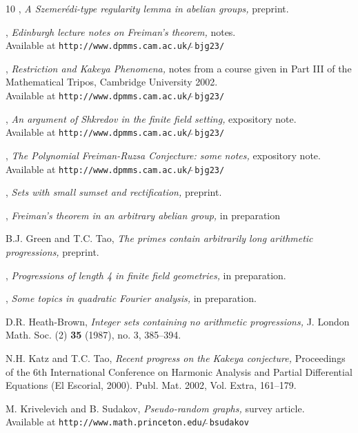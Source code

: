 \documentclass[12pt,a4paper,reqno]{amsart}
\numberwithin{equation}{section}
\theoremstyle{plain}
\theoremstyle{definition}
\begin{document}
\begin{thebibliography}{10}
 \bysame, \emph{A Szemer\'edi-type regularity lemma in abelian groups,} preprint.

 \bysame, \emph{Edinburgh lecture notes on Freiman's theorem,} notes.\\
Available at \texttt{http://www.dpmms.cam.ac.uk/$\widetilde{\;}$bjg23/}

 \bysame, \emph{Restriction and Kakeya Phenomena,} notes from a course given in Part III of the Mathematical Tripos, Cambridge University 2002.\\
Available at \texttt{http://www.dpmms.cam.ac.uk/$\widetilde{\;}$bjg23/}

 \bysame, \emph{An argument of Shkredov in the finite field setting,} expository note. \\
Available at \texttt{http://www.dpmms.cam.ac.uk/$\widetilde{\;}$bjg23/}

 \bysame, \emph{The Polynomial Freiman-Ruzsa Conjecture: some notes,} expository note.\\
Available at \texttt{http://www.dpmms.cam.ac.uk/$\widetilde{\;}$bjg23/}

 \bysame, \emph{Sets with small sumset and rectification,} preprint.

 \bysame, \emph{Freiman's theorem in an arbitrary abelian group,} in preparation

 B.J. Green and T.C. Tao, \emph{The primes contain arbitrarily long arithmetic progressions,} preprint.

 \bysame, \emph{Progressions of length 4 in finite field geometries,} in preparation.

 \bysame, \emph{Some topics in quadratic Fourier analysis,} in preparation.

 D.R. Heath-Brown, \emph{Integer sets containing no arithmetic progressions,} J. London Math. Soc. (2) \textbf{35} (1987), no. 3, 385--394.

 N.H. Katz and T.C. Tao, \emph{Recent progress on the Kakeya conjecture,} Proceedings of the 6th International Conference on Harmonic Analysis and Partial Differential Equations (El Escorial, 2000). Publ. Mat. 2002, Vol. Extra, 161--179.

 M. Krivelevich and B. Sudakov, \emph{Pseudo-random graphs,} survey article.\\
Available at \texttt{http://www.math.princeton.edu/$\widetilde{\;}$bsudakov}


\end{thebibliography}
\end{document}

